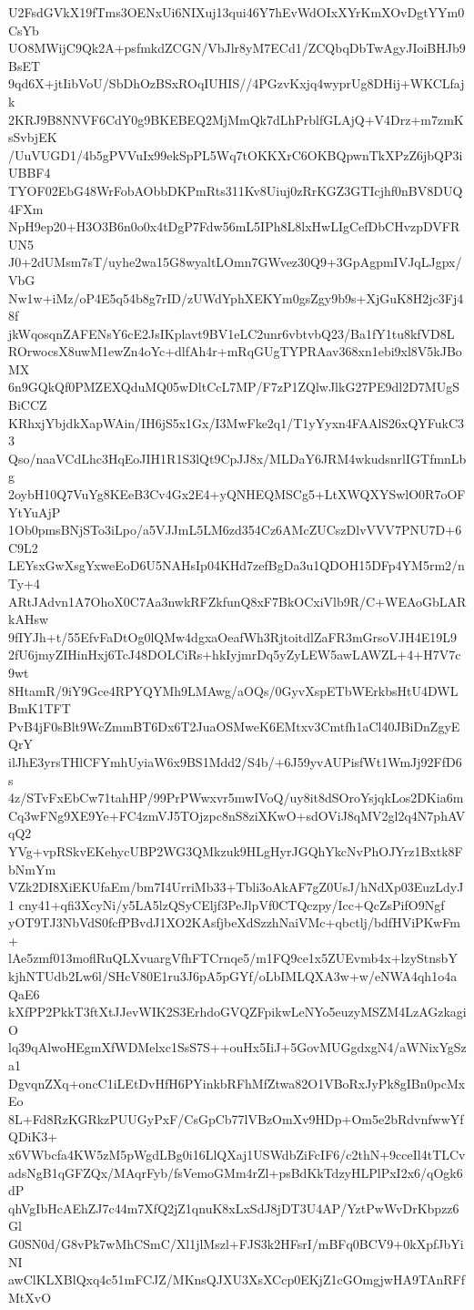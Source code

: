 U2FsdGVkX19fTms3OENxUi6NIXuj13qui46Y7hEvWdOIxXYrKmXOvDgtYYm0CsYb
UO8MWijC9Qk2A+psfmkdZCGN/VbJlr8yM7ECd1/ZCQbqDbTwAgyJIoiBHJb9BsET
9qd6X+jtIibVoU/SbDhOzBSxROqIUHIS//4PGzvKxjq4wyprUg8DHij+WKCLfajk
2KRJ9B8NNVF6CdY0g9BKEBEQ2MjMmQk7dLhPrblfGLAjQ+V4Drz+m7zmKsSvbjEK
/UuVUGD1/4b5gPVVuIx99ekSpPL5Wq7tOKKXrC6OKBQpwnTkXPzZ6jbQP3iUBBF4
TYOF02EbG48WrFobAObbDKPmRts311Kv8Uiuj0zRrKGZ3GTIcjhf0nBV8DUQ4FXm
NpH9ep20+H3O3B6n0o0x4tDgP7Fdw56mL5IPh8L8lxHwLIgCefDbCHvzpDVFRUN5
J0+2dUMsm7sT/uyhe2wa15G8wyaltLOmn7GWvez30Q9+3GpAgpmIVJqLJgpx/VbG
Nw1w+iMz/oP4E5q54b8g7rID/zUWdYphXEKYm0gsZgy9b9s+XjGuK8H2jc3Fj48f
jkWqosqnZAFENsY6cE2JsIKplavt9BV1eLC2unr6vbtvbQ23/Ba1fY1tu8kfVD8L
ROrwocsX8uwM1ewZn4oYc+dlfAh4r+mRqGUgTYPRAav368xn1ebi9xl8V5kJBoMX
6n9GQkQf0PMZEXQduMQ05wDltCcL7MP/F7zP1ZQlwJlkG27PE9dl2D7MUgSBiCCZ
KRhxjYbjdkXapWAin/IH6jS5x1Gx/I3MwFke2q1/T1yYyxn4FAAlS26xQYFukC33
Qso/naaVCdLhc3HqEoJIH1R1S3lQt9CpJJ8x/MLDaY6JRM4wkudsnrlIGTfmnLbg
2oybH10Q7VuYg8KEeB3Cv4Gx2E4+yQNHEQMSCg5+LtXWQXYSwlO0R7oOFYtYuAjP
1Ob0pmsBNjSTo3iLpo/a5VJJmL5LM6zd354Cz6AMcZUCszDlvVVV7PNU7D+6C9L2
LEYsxGwXsgYxweEoD6U5NAHsIp04KHd7zefBgDa3u1QDOH15DFp4YM5rm2/nTy+4
ARtJAdvn1A7OhoX0C7Aa3nwkRFZkfunQ8xF7BkOCxiVlb9R/C+WEAoGbLARkAHsw
9fIYJh+t/55EfvFaDtOg0lQMw4dgxaOeafWh3RjtoitdlZaFR3mGrsoVJH4E19L9
2fU6jmyZIHinHxj6TcJ48DOLCiRs+hkIyjmrDq5yZyLEW5awLAWZL+4+H7V7c9wt
8HtamR/9iY9Gce4RPYQYMh9LMAwg/aOQs/0GyvXspETbWErkbsHtU4DWLBmK1TFT
PvB4jF0sBlt9WcZmmBT6Dx6T2JuaOSMweK6EMtxv3Cmtfh1aCl40JBiDnZgyEQrY
ilJhE3yrsTHlCFYmhUyiaW6x9BS1Mdd2/S4b/+6J59yvAUPisfWt1WmJj92FfD6s
4z/STvFxEbCw71tahHP/99PrPWwxvr5mwIVoQ/uy8it8dSOroYsjqkLos2DKia6m
Cq3wFNg9XE9Ye+FC4zmVJ5TOjzpc8nS8ziXKwO+sdOViJ8qMV2gl2q4N7phAVqQ2
YVg+vpRSkvEKehycUBP2WG3QMkzuk9HLgHyrJGQhYkcNvPhOJYrz1Bxtk8FbNmYm
VZk2DI8XiEKUfaEm/bm7I4UrriMb33+Tbli3oAkAF7gZ0UsJ/hNdXp03EuzLdyJ1
cny41+qfi3XcyNi/y5LA5lzQSyCEljf3PeJlpVf0CTQczpy/Icc+QcZsPifO9Ngf
yOT9TJ3NbVdS0fcfPBvdJ1XO2KAsfjbeXdSzzhNaiVMc+qbctlj/bdfHViPKwFm+
lAe5zmf013moflRuQLXvuargVfhFTCrnqe5/m1FQ9ce1x5ZUEvmb4x+lzyStnsbY
kjhNTUdb2Lw6l/SHcV80E1ru3J6pA5pGYf/oLbIMLQXA3w+w/eNWA4qh1o4aQaE6
kXfPP2PkkT3ftXtJJevWIK2S3ErhdoGVQZFpikwLeNYo5euzyMSZM4LzAGzkagiO
lq39qAlwoHEgmXfWDMelxc1SsS7S++ouHx5IiJ+5GovMUGgdxgN4/aWNixYgSza1
DgvqnZXq+oncC1iLEtDvHfH6PYinkbRFhMfZtwa82O1VBoRxJyPk8gIBn0pcMxEo
8L+Fd8RzKGRkzPUUGyPxF/CsGpCb77lVBzOmXv9HDp+Om5e2bRdvnfwwYfQDiK3+
x6VWbcfa4KW5zM5pWgdLBg0i16LlQXaj1USWdbZiFcIF6/c2thN+9cceIl4tTLCv
adsNgB1qGFZQx/MAqrFyb/fsVemoGMm4rZl+psBdKkTdzyHLPlPxI2x6/qOgk6dP
qhVgIbHcAEhZJ7c44m7XfQ2jZ1qnuK8xLxSdJ8jDT3U4AP/YztPwWvDrKbpzz6Gl
G0SN0d/G8vPk7wMhCSmC/Xl1jlMszl+FJS3k2HFsrI/mBFq0BCV9+0kXpfJbYiNI
awClKLXBlQxq4c51mFCJZ/MKnsQJXU3XsXCcp0EKjZ1cGOmgjwHA9TAnRFfMtXvO

